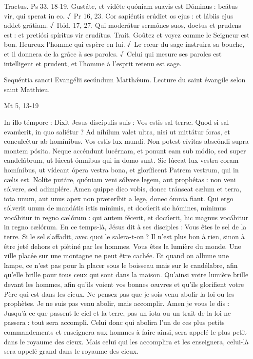 \begin{paracol}{2}
Tractus. Ps 33, 18-19. Gustáte, et vidéte quóniam suavis est Dóminus : beátus vir, qui sperat in eo. √~Pr 16, 23. Cor sapiéntis erúdiet os ejus : et lábiis ejus addet grátiam. √~Ibid. 17, 27. Qui moderátur sermónes suos, doctus et prudens est : et pretiósi spíritus vir erudítus.
\switchcolumn
Trait. Goûtez et voyez comme le Seigneur est bon. Heureux l’homme qui espère en lui. √~Le cœur du sage instruira sa bouche, et il donnera de la grâce à ses paroles. √~Celui qui mesure ses paroles est intelligent et prudent, et l’homme à l’esprit retenu est sage.
\switchcolumn*

Sequéntia sancti Evangélii secúndum Matthǽum.
\switchcolumn
Lecture du saint évangile selon saint Matthieu.
\switchcolumn*

Mt 5, 13-19
\switchcolumn

\switchcolumn*

In illo témpore : Dixit Jesus discípulis  suis : Vos estis sal terræ. Quod si sal evanúerit, in quo saliétur ? Ad níhilum valet ultra, nisi ut mittátur foras, et conculcétur ab homínibus. Vos estis lux mundi. Non potest cívitas abscóndi supra montem pósita. Neque accéndunt lucérnam, et ponunt eam sub módio, sed super candelábrum, ut lúceat ómnibus qui in domo sunt. Sic lúceat lux vestra coram homínibus, ut vídeant ópera vestra bona, et gloríficent Patrem vestrum, qui in cælis est. Nolíte putáre, quóniam veni sólvere legem, aut prophétas : non veni sólvere, sed adimplére. Amen quippe dico vobis, donec tránseat cælum et terra, iota unum, aut unus apex non præteríbit a lege, donec ómnia fiant. Qui ergo sólverit unum de mandátis istis mínimis, et docúerit sic hómines, mínimus vocábitur in regno cælórum : qui autem fécerit, et docúerit, hic magnus vocábitur in regno cælórum.
\switchcolumn
En ce temps-là, Jésus dit à ses disciples :  Vous êtes le sel de la terre. Si le sel s’affadit, avec quoi le salera-t-on ? Il n’est plus bon à rien, sinon à être jeté dehors et piétiné par les hommes. Vous êtes la lumière du monde. Une ville placée sur une montagne ne peut être cachée. Et quand on allume une lampe, ce n’est pas pour la placer sous le boisseau mais sur le candélabre, afin qu’elle brille pour tous ceux qui sont dans la maison. Qu’ainsi votre lumière brille devant les hommes, afin qu’ils voient vos bonnes œuvres et qu’ils glorifient votre Père qui est dans les cieux. Ne pensez pas que je sois venu abolir la loi ou les prophètes. Je ne suis pas venu abolir, mais accomplir. Amen je vous le dis : Jusqu’à ce que passent le ciel et la terre, pas un iota ou un trait de la loi ne passera : tout sera accompli. Celui donc qui abolira l’un de ces plus petits commandements et enseignera aux hommes à faire ainsi, sera appelé le plus petit dans le royaume des cieux. Mais celui qui les accomplira et les enseignera, celui-là sera appelé grand dans le royaume des cieux.
\switchcolumn*


\end{paracol}
